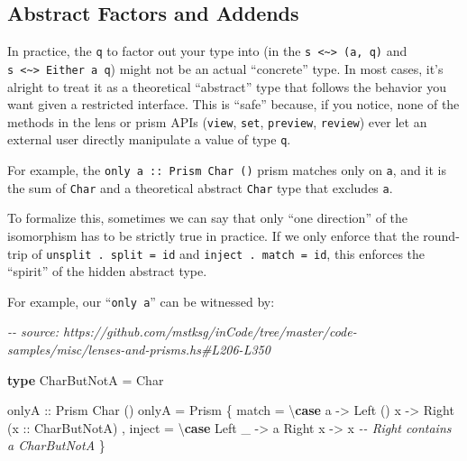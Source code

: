 \documentclass[]{article}
\newenvironment{Shaded}{}{}
\newcommand{\CharTok}[1]{\textcolor[rgb]{0.25,0.44,0.63}{#1}}
\newcommand{\CommentTok}[1]{\textcolor[rgb]{0.38,0.63,0.69}{\textit{#1}}}
\newcommand{\DataTypeTok}[1]{\textcolor[rgb]{0.56,0.13,0.00}{#1}}
\newcommand{\KeywordTok}[1]{\textcolor[rgb]{0.00,0.44,0.13}{\textbf{#1}}}
\newcommand{\NormalTok}[1]{#1}
\newcommand{\OtherTok}[1]{\textcolor[rgb]{0.00,0.44,0.13}{#1}}
\begin{document}
\subsection{Abstract Factors and Addends}\label{abstract-factors-and-addends}

In practice, the \texttt{q} to factor out your type into (in the
\texttt{s\ \textless{}\textasciitilde{}\textgreater{}\ (a,\ q)} and
\texttt{s\ \textless{}\textasciitilde{}\textgreater{}\ Either\ a\ q}) might not
be an actual ``concrete'' type. In most cases, it's alright to treat it as a
theoretical ``abstract'' type that follows the behavior you want given a
restricted interface. This is ``safe'' because, if you notice, none of the
methods in the lens or prism APIs (\texttt{view}, \texttt{set},
\texttt{preview}, \texttt{review}) ever let an external user directly manipulate
a value of type \texttt{q}.

For example, the
\texttt{only\ \textquotesingle{}a\textquotesingle{}\ ::\ Prism\textquotesingle{}\ Char\ ()}
prism matches only on \texttt{\textquotesingle{}a\textquotesingle{}}, and it is
the sum of \texttt{Char} and a theoretical abstract \texttt{Char} type that
excludes \texttt{\textquotesingle{}a\textquotesingle{}}.

To formalize this, sometimes we can say that only ``one direction'' of the
isomorphism has to be strictly true in practice. If we only enforce that the
round-trip of \texttt{unsplit\ .\ split\ =\ id} and
\texttt{inject\ .\ match\ =\ id}, this enforces the ``spirit'' of the hidden
abstract type.

For example, our ``\texttt{only\ \textquotesingle{}a\textquotesingle{}}'' can be
witnessed by:

\begin{Shaded}
\begin{Highlighting}[]
\CommentTok{{-}{-} source: https://github.com/mstksg/inCode/tree/master/code{-}samples/misc/lenses{-}and{-}prisms.hs\#L206{-}L350}

\KeywordTok{type} \DataTypeTok{CharButNotA} \OtherTok{=} \DataTypeTok{Char}

\OtherTok{onlyA ::} \DataTypeTok{Prism\textquotesingle{}} \DataTypeTok{Char}\NormalTok{ ()}
\NormalTok{onlyA }\OtherTok{=} \DataTypeTok{Prism\textquotesingle{}}
\NormalTok{    \{ match  }\OtherTok{=}\NormalTok{ \textbackslash{}}\KeywordTok{case}
        \CharTok{\textquotesingle{}a\textquotesingle{}} \OtherTok{{-}\textgreater{}} \DataTypeTok{Left}\NormalTok{ ()}
\NormalTok{        x   }\OtherTok{{-}\textgreater{}} \DataTypeTok{Right}\NormalTok{ (}\OtherTok{x ::} \DataTypeTok{CharButNotA}\NormalTok{)}
\NormalTok{    , inject }\OtherTok{=}\NormalTok{ \textbackslash{}}\KeywordTok{case}
        \DataTypeTok{Left}\NormalTok{  \_ }\OtherTok{{-}\textgreater{}} \CharTok{\textquotesingle{}a\textquotesingle{}}
        \DataTypeTok{Right}\NormalTok{ x }\OtherTok{{-}\textgreater{}}\NormalTok{ x        }\CommentTok{{-}{-} Right contains a CharButNotA}
\NormalTok{    \}}
\end{Highlighting}
\end{Shaded}
\end{document}
